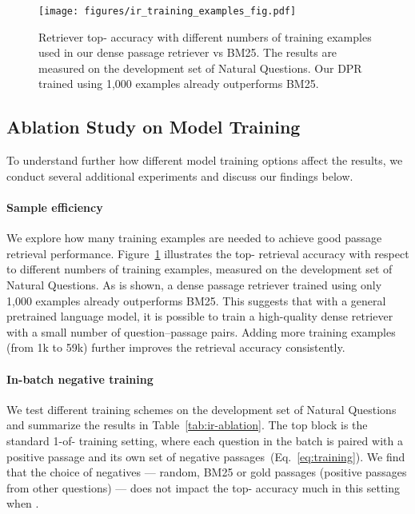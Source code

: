 \documentclass[11pt,a4paper]{article}
\begin{document}
\begin{figure}[!t]
    \center
    \texttt{[image: figures/ir\_training\_examples\_fig.pdf]}
    \caption{Retriever top- accuracy with different numbers of training examples used in our dense passage retriever vs BM25. The results are measured on the development set of Natural Questions. Our DPR trained using 1,000 examples already outperforms BM25. }
    \label{fig:ir-training-examples}
\end{figure}
 
\subsection{Ablation Study on Model Training}
\label{subsec:ablation-retrieval}

To understand further how different model training options affect the results, we conduct several additional experiments and discuss our findings below.

\paragraph{Sample efficiency}

We explore how many training examples are needed to achieve good passage retrieval performance. Figure~\ref{fig:ir-training-examples} illustrates the top- retrieval accuracy with respect to different numbers of training examples,
measured on the development set of Natural Questions.
As is shown, a dense passage retriever trained using only 1,000 examples already outperforms BM25. 
This suggests that with a general pretrained language model, it is possible to train a high-quality dense retriever with a small number of question--passage pairs.
Adding more training examples (from 1k to 59k) further improves the retrieval accuracy consistently.

\paragraph{In-batch negative training}
\label{sec:ir_ablation}
We test different training schemes on the development set of Natural Questions and summarize the results in Table~\ref{tab:ir-ablation}. 
The top block is the standard 1-of- training setting, where each question in the batch is paired with a positive passage and its own set of  negative passages~(Eq.~\eqref{eq:training}).
We find that the choice of negatives --- random, BM25 or gold passages (positive passages from other questions) --- does not impact the top- accuracy much in this setting when .
\end{document}
